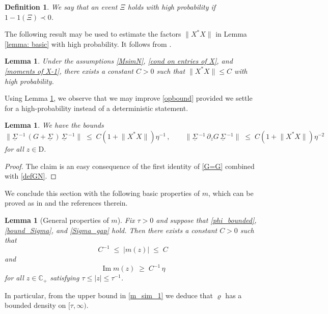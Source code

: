 \documentclass[11pt]{article} %
\numberwithin{equation}{section}
\numberwithin{figure}{section}
\theoremstyle{plain} %
\newtheorem{lemma}[theorem]{Lemma}
\newtheorem{definition}[theorem]{Definition}
\theoremstyle{definition} %
\newcommand{\f}[1]{\boldsymbol{\mathrm{#1}}} %
\newcommand{\ul}[1]{\underline{#1} \!\,} %
\newcommand{\C}{\mathbb{C}}
\renewcommand{\leq}{\leqslant}
\renewcommand{\geq}{\geqslant}
\newcommand{\ind}[1]{\f 1 (#1)}
\newcommand{\abs}[1]{\lvert #1 \rvert}
\newcommand{\norm}[1]{\lVert #1 \rVert}
\newcommand{\normb}[1]{\bigl\lVert #1 \bigr\rVert}
\DeclareMathOperator{\im}{Im}
\begin{document}
\begin{definition} \label{def:high_prob}
We say that an event $\Xi$ \emph{holds with high probability} if $1 - \ind{\Xi} \prec 0$.
\end{definition}


The following result may be used to estimate the factors $\norm{X^* X}$ in Lemma \ref{lemma: basic} with high probability. It follows from \cite[Theorem 2.10]{BEKYY}.
\begin{lemma} \label{lem:norm_XX}
Under the assumptions \eqref{MsimN}, \eqref{cond on entries of X}, and \eqref{moments of X-1}, there exists a constant $C > 0$ such that $\norm{X^* X}\leq C$ with high probability.
\end{lemma}

Using Lemma \ref{lem:norm_XX}, we observe that we may improve \eqref{opbound} provided we settle for a high-probability instead of a deterministic statement.

\begin{lemma} \label{lem:opnorm}
We have the bounds
\begin{equation*}
\normb{\ul \Sigma^{-1} \, (G + \ul \Sigma) \, \ul \Sigma^{-1}} \;\leq\; C (1 + \norm{X^* X}) \eta^{-1}\,, \qquad
\normb{\ul \Sigma^{-1} \, \partial_z G \, \ul \Sigma^{-1}} \;\leq\; C (1 + \norm{X^* X}) \eta^{-2}
\end{equation*}
for all $z \in \f D$.
\end{lemma}
\begin{proof}
The claim is an easy consequence of the first identity of \eqref{G=G} combined with \eqref{defGN}.
\end{proof}


We conclude this section with the following basic properties of $m$, which can be proved as in \cite{BaoPanZhou} and the references therein.
\begin{lemma}[General properties of $m$] \label{lem:gen_prop_m}
Fix $\tau > 0$ and suppose that \eqref{phi_bounded}, \eqref{bound_Sigma}, and \eqref{Sigma_gap} hold. Then there exists a constant $C > 0$ such that
\begin{equation} \label{m_sim_1}
C^{-1} \;\leq\; \abs{m(z)} \;\leq\; C
\end{equation}
and
\begin{equation} \label{Im_m_geq_c}
\im m(z) \;\geq\; C^{-1} \, \eta
\end{equation}
for all $z \in \C_+$ satisfying $\tau \leq \abs{z} \leq \tau^{-1}$.
\end{lemma}
In particular, from the upper bound in \eqref{m_sim_1} we deduce that $\varrho$ has a bounded density on $[\tau,\infty)$.
\end{document}
